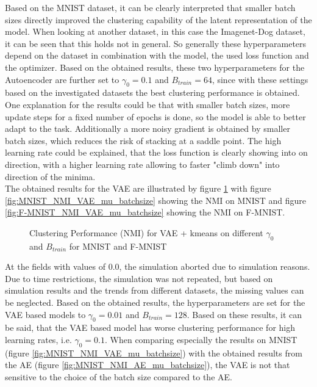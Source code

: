 \documentclass[12pt,DIV14,BCOR12mm,a4paper,footexclude,headinclude,halfparskip-,twoside,openright,cleardoubleempty,idxtotoc,bibtotoc,listtotoc]{scrreprt} %
\numberwithin{equation}{chapter}
\begin{document}
Based on the MNIST dataset, it can be clearly interpreted that smaller batch sizes directly improved the clustering capability of the latent representation of the model. When looking at another dataset, in this case the Imagenet-Dog dataset, it can be seen that this holds not in general. So generally these hyperparameters depend on the dataset in combination with the model, the used loss function and the optimizer. Based on the obtained results, these two hyperparameters for the Autoencoder are further set to $\gamma_0=0.1$ and $B_{train}=64$, since with these settings based on the investigated datasets the best clustering performance is obtained. One explanation for the results could be that with smaller batch sizes, more update steps for a fixed number of epochs is done, so the model is able to better adapt to the task. Additionally a more noisy gradient is obtained by smaller batch sizes, which reduces the risk of stacking at a saddle point. The high learning rate could be explained, that the loss function is clearly showing into on direction, with a higher learning rate allowing to faster "climb down" into direction of the minima.\\
The obtained results for the VAE are illustrated by figure \ref{fig:ClusterPerformance_VAE_LearningRate_BatchSize} with figure \ref{fig:MNIST_NMI_VAE_mu_batchsize} showing the NMI on MNIST and figure \ref{fig:F-MNIST_NMI_VAE_mu_batchsize} showing the NMI on F-MNIST.
	 \begin{figure}[htb!]
		\centering
		\qquad
		\caption{Clustering Performance (NMI) for VAE + kmeans on different $\gamma_0$ and $B_{train}$ for MNIST and F-MNIST}
		\label{fig:ClusterPerformance_VAE_LearningRate_BatchSize}
	\end{figure}
At the fields with values of $0.0$, the simulation aborted due to simulation reasons. Due to time restrictions, the simulation was not repeated, but based on simulation results and the trends from different datasets, the missing values can be neglected. Based on the obtained results, the hyperparameters are set for the VAE based models to $\gamma_0=0.01$ and $B_{train}=128$. Based on these results, it can be said, that the VAE based model has worse clustering performance for high learning rates, i.e. $\gamma_0=0.1$. When comparing especially the results on MNIST (figure \ref{fig:MNIST_NMI_VAE_mu_batchsize}) with the obtained results from the AE (figure \ref{fig:MNIST_NMI_AE_mu_batchsize}), the VAE is not that sensitive to the choice of the batch size compared to the AE.\\
\end{document}

